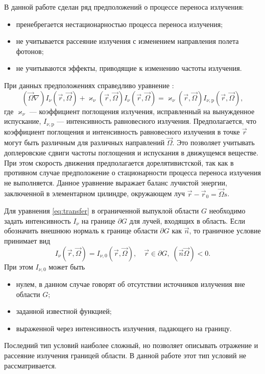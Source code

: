 В данной работе сделан ряд предположений о процессе переноса излучения:
\begin{itemize}
\item пренебрегается нестационарностью процесса переноса излучения;
\item не учитывается рассеяние излучения с изменением направления полета фотонов;
\item не учитываются эффекты, приводящие к изменению частоты излучения.
\end{itemize}
При данных предположениях справедливо уравнение \cite{zeldovich2008}:
\begin{equation}
(\vec \Omega \nabla) I_\nu(\vec r, \vec \Omega) + \varkappa_\nu(\vec r, \vec \Omega) I_\nu(\vec r, \vec \Omega) = 
\varkappa_\nu(\vec r, \vec \Omega) I_{\nu,\text{p}}(\vec r, \vec \Omega),
\label{eq:transfer}
\end{equation}
где $\varkappa_\nu$ --- коэффициент поглощения излучения, исправленный на вынужденное испускание, $I_{\nu, \text{p}}$ --- интенсивность равновесного излучения. Предполагается, что коэффициент поглощения и интенсивность равновесного излучения в точке $\vec r$ могут быть различным для различных направлений $\vec \Omega$. Это позволяет учитывать доплеровские сдвиги частоты поглощения и испускания в движущемся веществе. При этом скорость движения предполагается дорелятивистской, так как в противном случае предположение о стационарности процесса переноса излучения не выполняется. Данное уравнение выражает баланс лучистой энергии, заключенной в элементарном цилиндре, окружающем луч $\vec r - \vec r_0 = \vec \Omega s$.

Для уравнения \eqref{eq:transfer} в ограниченной выпуклой области $G$ необходимо задать интенсивность $I_\nu$ на границе $\partial G$ для лучей, входящих в область. Если обозначить внешнюю нормаль к границе области $\partial G$ как $\vec n$, то граничное условие принимает вид
\[
I_\nu(\vec r, \vec \Omega) = I_{\nu,0}(\vec r, \vec \Omega), \quad \vec r \in \partial G,\; (\vec n \vec \Omega) < 0.
\]
При этом $I_{\nu,0}$ может быть
\begin{itemize}
\item нулем, в данном случае говорят об отсутствии источников излучения вне области $G$;
\item заданной известной функцией;
\item выраженной через интенсивность излучения, падающего на границу.
\end{itemize}
Последний тип условий наиболее сложный, но позволяет описывать отражение и рассеяние излучения границей области. В данной работе этот тип условий не рассматривается.

